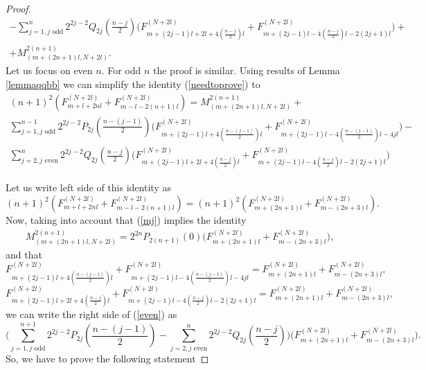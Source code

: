 \documentclass[11pt]{amsart}
\begin{document}
\begin{proof}
\begin{eqnarray*}
	-\sum_{j=1,\text{$j$ odd}}^{n}2^{2j-2}Q_{2j}(\frac{n-j}{2})\Big(F^{(N+2l)}_{m+(2j-1)l+2l+4(\frac{n-j}{2})l}+F^{(N+2l)}_{m+(2j-1)l-4(\frac{n-j}{2})l-2(2j+1)l}\Big)+\nonumber\\
	+M^{2(n+1)}_{(m+(2n+1)l,N+2l)}.
	\end{eqnarray*}
	Let us focus on even $n$. For odd $n$ the proof is similar. Using results of Lemma \ref{lemmaqqbb}
	we can simplify the identity (\ref{needtoprove}) to 
	\begin{eqnarray}\label{even}
	(n+1)^2(F^{(N+2l)}_{m+l+2nl}+F^{(N+2l)}_{m-l-2(n+1)l})=M^{2(n+1)}_{(m+(2n+1)l,N+2l)}+\\
 \sum_{j=1,\text{$j$ odd}}^{n-1}2^{2j-2}P_{2j}(\frac{n-(j-1)}{2})\Big(F^{(N+2l)}_{m+(2j-1)l+4(\frac{n-(j-1)}{2})l}+F^{(N+2l)}_{m+(2j-1)l-4(\frac{n-(j-1)}{2})l-4jl}\Big)- \nonumber \\
	\sum_{j=2,\text{$j$ even}}^{n}2^{2j-2}Q_{2j}(\frac{n-j}{2})\Big(F^{(N+2l)}_{m+(2j-1)l+2l+4(\frac{n-j}{2})l}+F^{(N+2l)}_{m+(2j-1)l-4(\frac{n-j}{2})l-2(2j+1)l}\Big)\nonumber
	\end{eqnarray}\par
	Let us write left side of this identity as 
	\begin{equation*}
	(n+1)^2( F^{(N+2l)}_{m+l+2nl}+F^{(N+2l)}_{m-l-2(n+1)l})=(n+1)^2( F^{(N+2l)}_{m+(2n+1)l}+F^{(N+2l)}_{m-(2n+3)l}).
	\end{equation*}
	Now, taking into account that (\ref{mj}) implies the identity 
	\begin{eqnarray*}
		M^{2(n+1)}_{(m+(2n+1)l,N+2l)}=2^{2n}P_{2(n+1)}(0)\Big(F^{(N+2l)}_{m+(2n+1)l}+F^{(N+2l)}_{m-(2n+3)l} \Big),
	\end{eqnarray*}
	and that
	\begin{equation*}
	F^{(N+2l)}_{m+(2j-1)l+4(\frac{n-(j-1)}{2})l}+F^{(N+2l)}_{m+(2j-1)l-4(\frac{n-(j-1)}{2})l-4jl}=F^{(N+2l)}_{m+(2n+1)l}+F^{(N+2l)}_{m-(2n+3)l},
	\end{equation*}
	\begin{equation*}
	F^{(N+2l)}_{m+(2j-1)l+2l+4(\frac{n-j}{2})l}+F^{(N+2l)}_{m+(2j-1)l-4(\frac{n-j}{2})l-2(2j+1)l}=F^{(N+2l)}_{m+(2n+1)l}+F^{(N+2l)}_{m-(2n+3)l},
	\end{equation*}
	we can write the right side of  (\ref{even}) as
	\begin{equation*}
	\Big(\sum_{j=1,\text{$j$ odd}}^{n+1}2^{2j-2}P_{2j}(\frac{n-(j-1)}{2})-\sum_{j=2,\text{$j$ even}}^{n}2^{2j-2}Q_{2j}(\frac{n-j}{2})\Big)\Big(F^{(N+2l)}_{m+(2n+1)l}+F^{(N+2l)}_{m-(2n+3)l}\Big).
	\end{equation*}
	So, we have to prove the following statement
	

\end{proof}
\end{document}
